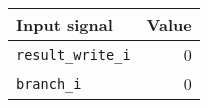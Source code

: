 {
\footnotesize
\begin{tabular}{|l|r|}
  \hline
  \cellcolor{gray!20}\textbf{Input signal} & \cellcolor{gray!20}\textbf{Value} \\
  \hline
  \texttt{result\_write\_i} & 0 \\
  \hline
  \texttt{branch\_i} & 0 \\
  \hline
\end{tabular}
}
